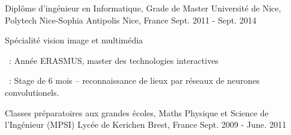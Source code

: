 \begin{cventries}
  \cventry
    {Diplôme d'ingénieur en Informatique, Grade de Master} %
    {Université de Nice, Polytech Nice-Sophia Antipolis} %
    {Nice, France} %
    {Sept. 2011 - Sept. 2014} %
    {
      \begin{cvitems} %
        \item Spécialité vision image et multimédia
        \item {}~: Année ERASMUS, master des technologies interactives
        \item {}~: Stage de 6 mois -- reconnaissance de lieux par réseaux de neurones convolutionels.
      \end{cvitems}
    }


  \cventry
    {Classes préparatoires aux grandes écoles, Maths Physique et Science de l'Ingénieur (MPSI)} %
    {Lycée de Kerichen} %
    {Brest, France} %
    {Sept. 2009 - June. 2011} %
    {}
\end{cventries}
